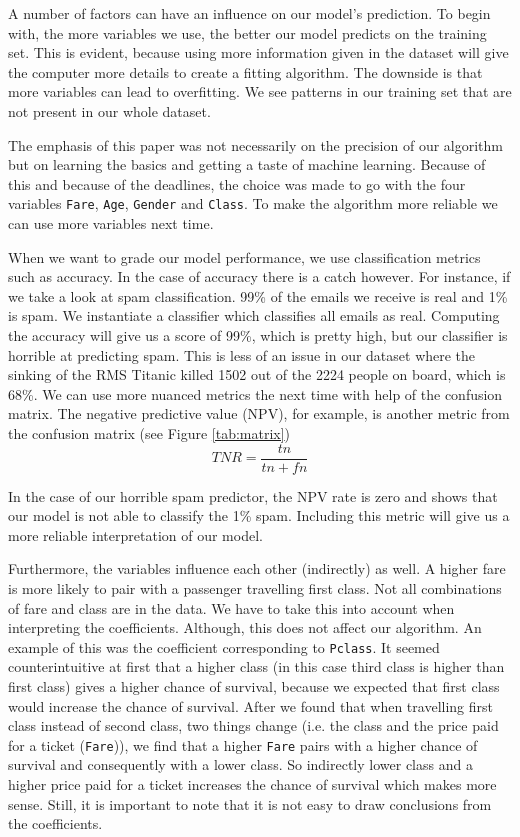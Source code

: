 \documentclass[11pt]{article}
\begin{document}
A number of factors can have an influence on our model's prediction. To begin with, the more variables we use, the better  our model predicts on the training set. This is evident, because using more information given in the dataset will give the computer more details to create a fitting algorithm. The downside is that more variables can lead to overfitting. We see patterns in our training set that are not present in our whole dataset.

The emphasis of this paper was not necessarily on the precision of our algorithm but on learning the basics and getting a taste of machine learning. Because of this and because of the deadlines, the choice was made to go with the four variables \texttt{Fare}, \texttt{Age}, \texttt{Gender} and \texttt{Class}. To make the algorithm more reliable we can use more variables next time.  

When we want to grade our model performance, we use classification metrics such as accuracy. In the case of accuracy there is a catch however. For instance, if we take a look at spam classification. 99\% of the emails we receive is real and 1\% is spam. We instantiate a classifier which classifies all emails as real. Computing the accuracy will give us a score of 99\%, which is pretty high, but our classifier is horrible at predicting spam. This is less of an issue in our dataset where the sinking of the RMS Titanic killed 1502 out of the 2224 people on board, which is 68\%. We can use more nuanced metrics the next time with help of the confusion matrix. The negative predictive value (NPV), for example, is another metric from the confusion matrix (see Figure \ref{tab:matrix})
\begin{equation}
TNR = \frac{tn}{tn+fn}
\end{equation} 

In the case of our horrible spam predictor, the NPV rate is zero and shows that our model is not able to classify the 1\% spam. Including this metric will give us a more reliable interpretation of our model. 

Furthermore, the variables influence each other (indirectly) as well. A higher fare is more likely to pair with a passenger travelling first class. Not all combinations of  fare and class are in the data. We have to take this into account when interpreting the coefficients. Although, this does not affect our algorithm. An example of this was the coefficient corresponding to \texttt{Pclass}. It seemed counterintuitive at first that a higher class (in this case third class is higher than first class) gives a higher chance of survival, because we expected that first class would increase the chance of survival. After we found that when travelling first class instead of second class, two things change (i.e. the class and the price paid for a ticket (\texttt{Fare})), we find that a higher \texttt{Fare} pairs with a higher chance of survival and consequently with a lower class. So indirectly lower class and a higher price paid for a ticket increases the chance of survival which makes more sense. Still, it is important to note that it is not easy to draw conclusions from the coefficients. 
\end{document}
